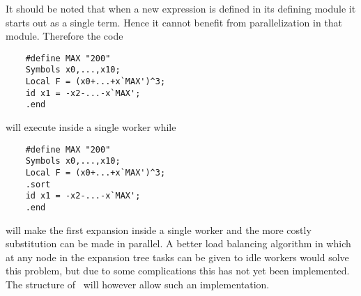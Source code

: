 It should be noted that when a new expression is defined in its defining 
module it starts out as a single term. Hence it cannot benefit from 
parallelization in that module. Therefore the code
\begin{verbatim}
    #define MAX "200"
    Symbols x0,...,x10;
    Local F = (x0+...+x`MAX')^3;
    id x1 = -x2-...-x`MAX';
    .end
\end{verbatim}
will execute inside a single worker while
\begin{verbatim}
    #define MAX "200"
    Symbols x0,...,x10;
    Local F = (x0+...+x`MAX')^3;
    .sort
    id x1 = -x2-...-x`MAX';
    .end
\end{verbatim}
will make the first expansion inside a single worker and the more costly 
substitution can be made in parallel. A better load 
balancing algorithm in which at any node in the expansion tree tasks can be 
given to idle workers would solve this problem, but due to some 
complications this has not yet been implemented. The structure of \FORM\ will 
however allow such an implementation.

